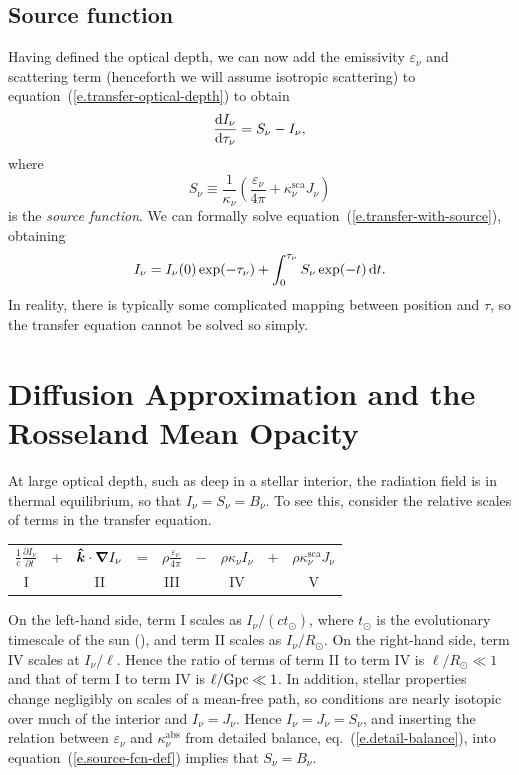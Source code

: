 \subsection{Source function}

Having defined the optical depth, we can now add the emissivity $\varepsilon_{\nu}$ and scattering term (henceforth we will assume isotropic scattering) to equation~(\ref{e.transfer-optical-depth}) to obtain
\begin{equation}\label{e.transfer-with-source}
\frac{\mathrm{d} I_{\nu}}{\mathrm{d} \tau_{\nu}} = S_{\nu}-I_{\nu},
\end{equation}
where 
\begin{equation}\label{e.source-fcn-def}
S_{\nu} \equiv \frac{1}{\kappa_{\nu}}\left(\frac{\varepsilon_{\nu}}{4\pi} + \kappa_{\nu}^{\mathrm{sca}}J_{\nu}\right)
\end{equation}
is the \emph{source function}. 
We can formally solve equation~(\ref{e.transfer-with-source}), obtaining
\[ I_{\nu} = I_{\nu}(0)\exp(-\tau_{\nu}) + \int_{0}^{\tau_{\nu}} S_{\nu} \exp(-t)\,\mathrm{d} t. \]
In reality, there is typically some complicated mapping between position and $\tau$, so the transfer equation cannot be solved so simply.

\section[Diffusion Approximation]{Diffusion Approximation and the Rosseland Mean Opacity}

At large optical depth, such as deep in a stellar interior, the radiation field is in thermal equilibrium, so that $I_{\nu} = S_{\nu} = B_{\nu}$. To see this, consider the relative scales of terms in the transfer equation.
\begin{center}\begin{tabular}{ccccccccc}
$\displaystyle \frac{1}{c}\frac{\partial I_{\nu}}{\partial t}$ & + &
$\displaystyle  \boldsymbol{\hat{k}}\cdot\boldsymbol{\nabla} I_{\nu}$ & = &
$\displaystyle\rho\frac{\varepsilon_{\nu}}{4\pi} $ & $-$ & 
$\displaystyle \rho\kappa_{\nu} I_{\nu}$ & $+$ &
$\displaystyle \rho\kappa_{\nu}^{\mathrm{sca}} J_{\nu}$\\
I & & II & & III & & IV & & V
\end{tabular}
\end{center}
On the left-hand side, term I scales as $I_{\nu}/(c t_{\odot})$, where $t_{\odot}$ is the evolutionary timescale of the sun (\Giga\yr), and term II scales as $I_{\nu}/R_{\odot}$. On the right-hand side, term IV scales at $I_{\nu}/\ell$.  Hence the ratio of terms of term II to term IV is $\ell/R_{\odot}\ll 1$ and that of term I to term IV is $\ell/\mathrm{G}\mathrm{pc}\ll 1$. In addition, stellar properties change negligibly on scales of a mean-free path, so conditions are nearly isotopic over much of the interior and $I_{\nu} = J_{\nu}$. Hence $I_{\nu} = J_{\nu} = S_{\nu}$, and inserting the relation between $\varepsilon_{\nu}$ and $\kappa_{\nu}^{\mathrm{abs}}$ from detailed balance, eq.~(\ref{e.detail-balance}), into equation~(\ref{e.source-fcn-def}) implies that $S_{\nu} = B_{\nu}$.

